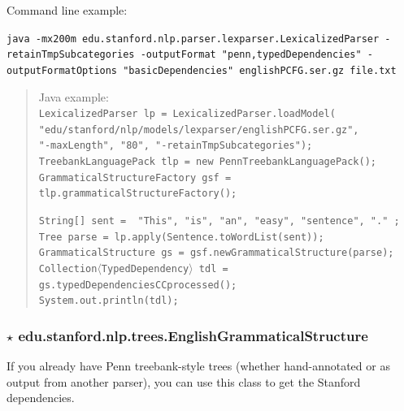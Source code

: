 \documentclass[11pt,letter]{article}
\begin{document}
\bigskip

\noindent Command line example: \\
{\hangindent=0.4in
\raggedright\texttt{java -mx200m edu.stanford.nlp.parser.lexparser.LexicalizedParser -retainTmpSubcategories -outputFormat "penn,typedDependencies" -outputFormatOptions "basicDependencies" englishPCFG.ser.gz file.txt}\\}

\begin{quote}
\hspace*{-0.375in}%
Java example: \\
\small\texttt{LexicalizedParser lp = LexicalizedParser.loadModel(\\
\hspace*{1.5in}"edu/stanford/nlp/models/lexparser/englishPCFG.ser.gz",\\
\hspace*{1.5in}"-maxLength", "80", "-retainTmpSubcategories"); \\
TreebankLanguagePack tlp = new PennTreebankLanguagePack(); \\
GrammaticalStructureFactory gsf = tlp.grammaticalStructureFactory();}

\bigskip

\noindent
\texttt{String[] sent = { "This", "is", "an", "easy", "sentence", "." }; \\
Tree parse = lp.apply(Sentence.toWordList(sent)); \\
GrammaticalStructure gs = gsf.newGrammaticalStructure(parse); \\
Collection$\langle$TypedDependency$\rangle$ tdl = gs.typedDependenciesCCprocessed(); \\
System.out.println(tdl); }
\end{quote}

\subsubsection*{$\star$ \textbf{edu.stanford.nlp.trees.EnglishGrammaticalStructure}}
If you already have Penn treebank-style trees (whether hand-annotated or as output from another parser), you can use this class to get the Stanford dependencies.
\end{document}
